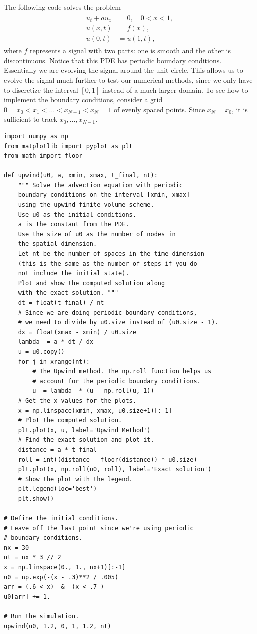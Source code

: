 The following code solves the problem
\begin{align}
\begin{split}
	u_t +a u_x &= 0, \quad 0 < x < 1, \\
	u(x,t) &= f(x),\\
	u(0,t) &= u(1,t),
\end{split}\label{eqn:fv_exercise}
\end{align}
where $f$ represents a signal with two parts: one is smooth and the other is discontinuous.
Notice that this PDE has periodic boundary conditions.
Essentially we are evolving the signal around the unit circle.
This allows us to evolve the signal much further to test our numerical methods, since we only have to discretize the interval $[0,1]$ instead of a much larger domain.
To see how to implement the boundary conditions, consider a grid $0 = x_0< x_1< \ldots< x_{N-1}< x_N = 1$ of evenly spaced points.
Since $x_N = x_0$, it is sufficient to track $x_0, \ldots , x_{N-1}$.

\begin{lstlisting}
import numpy as np
from matplotlib import pyplot as plt
from math import floor

def upwind(u0, a, xmin, xmax, t_final, nt):
    """ Solve the advection equation with periodic
    boundary conditions on the interval [xmin, xmax]
    using the upwind finite volume scheme.
    Use u0 as the initial conditions.
    a is the constant from the PDE.
    Use the size of u0 as the number of nodes in
    the spatial dimension.
    Let nt be the number of spaces in the time dimension
    (this is the same as the number of steps if you do
    not include the initial state).
    Plot and show the computed solution along
    with the exact solution. """
    dt = float(t_final) / nt
    # Since we are doing periodic boundary conditions,
    # we need to divide by u0.size instead of (u0.size - 1).
    dx = float(xmax - xmin) / u0.size
    lambda_ = a * dt / dx
    u = u0.copy()
    for j in xrange(nt):
        # The Upwind method. The np.roll function helps us
        # account for the periodic boundary conditions.
        u -= lambda_ * (u - np.roll(u, 1))
    # Get the x values for the plots.
    x = np.linspace(xmin, xmax, u0.size+1)[:-1]
    # Plot the computed solution.
    plt.plot(x, u, label='Upwind Method')
    # Find the exact solution and plot it.
    distance = a * t_final
    roll = int((distance - floor(distance)) * u0.size)
    plt.plot(x, np.roll(u0, roll), label='Exact solution')
    # Show the plot with the legend.
    plt.legend(loc='best')
    plt.show()

# Define the initial conditions.
# Leave off the last point since we're using periodic
# boundary conditions.
nx = 30
nt = nx * 3 // 2
x = np.linspace(0., 1., nx+1)[:-1]
u0 = np.exp(-(x - .3)**2 / .005)
arr = (.6 < x)  &  (x < .7 )
u0[arr] += 1.

# Run the simulation.
upwind(u0, 1.2, 0, 1, 1.2, nt)
\end{lstlisting}

